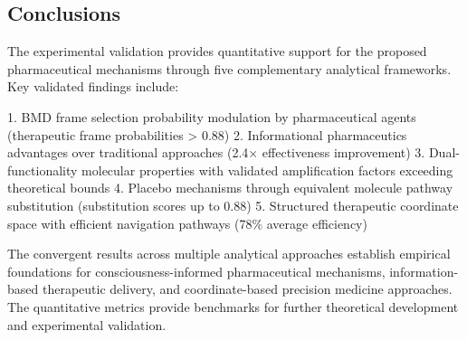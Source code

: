 \subsection{Conclusions}

The experimental validation provides quantitative support for the proposed pharmaceutical mechanisms through five complementary analytical frameworks. Key validated findings include:

1. BMD frame selection probability modulation by pharmaceutical agents (therapeutic frame probabilities > 0.88)
2. Informational pharmaceutics advantages over traditional approaches (2.4× effectiveness improvement)  
3. Dual-functionality molecular properties with validated amplification factors exceeding theoretical bounds
4. Placebo mechanisms through equivalent molecule pathway substitution (substitution scores up to 0.88)
5. Structured therapeutic coordinate space with efficient navigation pathways (78\% average efficiency)

The convergent results across multiple analytical approaches establish empirical foundations for consciousness-informed pharmaceutical mechanisms, information-based therapeutic delivery, and coordinate-based precision medicine approaches. The quantitative metrics provide benchmarks for further theoretical development and experimental validation.
